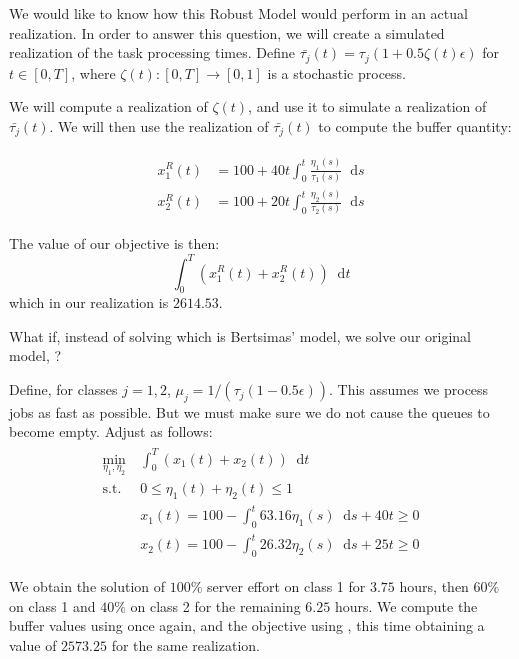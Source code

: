 \documentclass[11pt,a4paper,titlepage]{article}
\newcommand*{\dd}{\ensuremath{\mathop{}\!\mathrm{d}}}%
\theoremstyle{definition}
\theoremstyle{plain}
\begin{document}
We would like to know how this Robust Model would perform in an actual realization.
In order to answer this question,
we will create a simulated realization of the task processing times.
Define
$\bar{\tau_j}(t) = \tau_j (1 + 0.5\zeta(t) \epsilon)$
for $t \in [0,T]$,
where $\zeta(t):[0,T] \to [0,1]$ is a stochastic process.

We will compute a realization of $\zeta(t)$,
and use it to simulate a realization of $\bar{\tau_j}(t)$.
We will then use the realization of $\bar{\tau_j}(t)$ to compute the buffer quantity:

\begin{align}
\label{eq:buffer-robust-realization}
\begin{split}
    x_1^R (t) &= 100 + 40 t \int_0^t \frac{\eta_1(s)}{\tau_1(s)} \dd s \\
    x_2^R (t) &= 100 + 20 t \int_0^t \frac{\eta_2(s)}{\tau_2(s)} \dd s
\end{split}
\end{align}

The value of our objective is then:
\begin{equation}
    \label{eq:cost-robust-realization}
    \int_0^T \left( x_1^R(t) + x_2^R(t) \right) \dd t
\end{equation}
which in our realization is $2614.53$.

What if,
instead of solving \modeltwo which is Bertsimas' model,
we solve our original model,
\modelone?

Define,
for classes $j=1,2$,
$\mu_j=1/(\tau_j ( 1 - 0.5 \epsilon))$.
This assumes we process jobs as fast as possible.
But we must make sure we do not cause the queues to become empty.
Adjust \modelone as follows:
\begin{align}
    \label{eq:model-1-robust}
    \begin{split}
        \min\limits_{\eta_1, \eta_2}
        &~ \int_0^T \left( x_1(t) + x_2(t) \right) \dd t \\
        \text{s.t.}
        &~ 0 \leq \eta_1(t) + \eta_2(t) \leq 1 \\
        &~ x_1(t) = 100 - \int_0^t 63.16 \eta_1(s) \dd s + 40t \geq 0 \\
        &~ x_2(t) = 100 - \int_0^t 26.32 \eta_2(s) \dd s + 25t \geq 0
    \end{split}
\end{align}

We obtain the solution of $100\%$ server effort on class 1 for $3.75$ hours,
then $60\%$ on class 1 and $40\%$ on class 2 for the remaining $6.25$ hours.
We compute the buffer values using  once again,
and the objective using ,
this time obtaining a value of $2573.25$ for the same realization.
\end{document}
